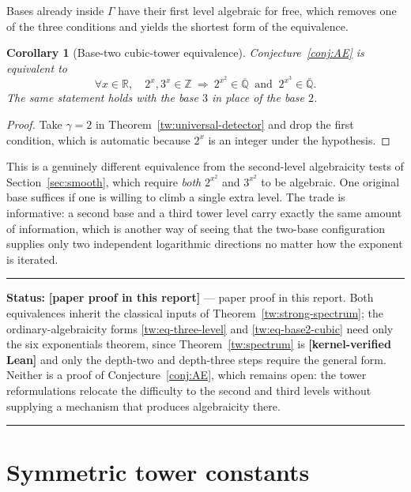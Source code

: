 \documentclass[11pt,oneside]{article}
\newtheorem{corollary}[theorem]{Corollary}
\theoremstyle{definition}
\theoremstyle{remark}
\newcommand{\Z}{\mathbb Z}
\newcommand{\R}{\mathbb R}
\newcommand{\Abar}{\overline{\mathbb Q}}
\newcommand{\GammaSat}{\Gamma}
\newcommand{\statuslean}{\textcolor{leanblue}{\textbf{[kernel-verified Lean]}}}
\newcommand{\statusnew}{\textcolor{newgreen}{\textbf{[paper proof in this report]}}}
\newenvironment{statusbox}[1]
{\begin{center}\begin{minipage}{0.94\textwidth}\raggedright\hbadness=10000\hrule
\vspace{0.45em}\textbf{Status:} #1\par\vspace{0.35em}}
{\vspace{0.35em}\hrule\end{minipage}\end{center}}
\begin{document}
Bases already inside $\GammaSat$ have their first level algebraic for free, which removes one
of the three conditions and yields the shortest form of the equivalence.

\begin{corollary}[Base-two cubic-tower equivalence]
\label{tw:base2-equivalence}
Conjecture~\ref{conj:AE} is equivalent to
\begin{equation}
 \forall x\in\R,\quad
 2^x,3^x\in\Z
 \ \Longrightarrow\
 2^{x^2}\in\Abar\ \text{ and }\ 2^{x^3}\in\Abar .
 \label{tw:eq-base2-cubic}
\end{equation}
The same statement holds with the base $3$ in place of the base $2$.
\end{corollary}

\begin{proof}
Take $\gamma=2$ in Theorem~\ref{tw:universal-detector} and drop the first condition, which is
automatic because $2^x$ is an integer under the hypothesis.
\end{proof}

This is a genuinely different equivalence from the second-level algebraicity tests of
Section~\ref{sec:smooth}, which require \emph{both} $2^{x^2}$ and $3^{x^2}$ to be algebraic.
One original base suffices if one is willing to climb a single extra level.  The trade is
informative: a second base and a third tower level carry exactly the same amount of
information, which is another way of seeing that the two-base configuration supplies only two
independent logarithmic directions no matter how the exponent is iterated.

\begin{statusbox}{\statusnew{} --- paper proof in this report.  Both equivalences inherit the
classical inputs of Theorem~\ref{tw:strong-spectrum}; the ordinary-algebraicity forms
\eqref{tw:eq-three-level} and \eqref{tw:eq-base2-cubic} need only the six exponentials
theorem, since Theorem~\ref{tw:spectrum} is \statuslean{} and only the depth-two and
depth-three steps require the general form.  Neither is a proof of
Conjecture~\ref{conj:AE}, which remains open: the tower reformulations relocate the
difficulty to the second and third levels without supplying a mechanism that produces
algebraicity there.}
\end{statusbox}

\section{Symmetric tower constants}
\label{sec:symmetric}
\end{document}
